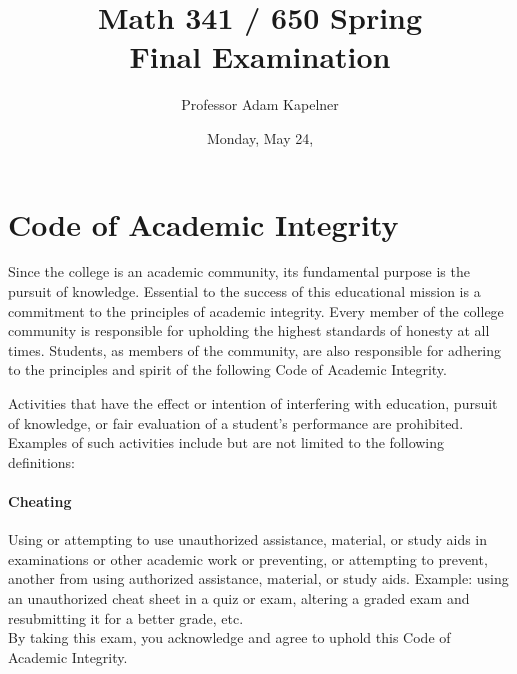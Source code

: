 \documentclass[12pt,landscape]{article}
\title{Math 341 / 650 Spring \the\year{} \\ Final Examination}
\author{Professor Adam Kapelner}
\date{Monday, May 24, \the\year{}}
\begin{document}
\maketitle


\thispagestyle{empty}

\section*{Code of Academic Integrity}

\footnotesize
Since the college is an academic community, its fundamental purpose is the pursuit of knowledge. Essential to the success of this educational mission is a commitment to the principles of academic integrity. Every member of the college community is responsible for upholding the highest standards of honesty at all times. Students, as members of the community, are also responsible for adhering to the principles and spirit of the following Code of Academic Integrity.

Activities that have the effect or intention of interfering with education, pursuit of knowledge, or fair evaluation of a student's performance are prohibited. Examples of such activities include but are not limited to the following definitions:

\paragraph{Cheating} Using or attempting to use unauthorized assistance, material, or study aids in examinations or other academic work or preventing, or attempting to prevent, another from using authorized assistance, material, or study aids. Example: using an unauthorized cheat sheet in a quiz or exam, altering a graded exam and resubmitting it for a better grade, etc.
\\

\noindent By taking this exam, you acknowledge and agree to uphold this Code of Academic Integrity. \\


\normalsize
\end{document}
